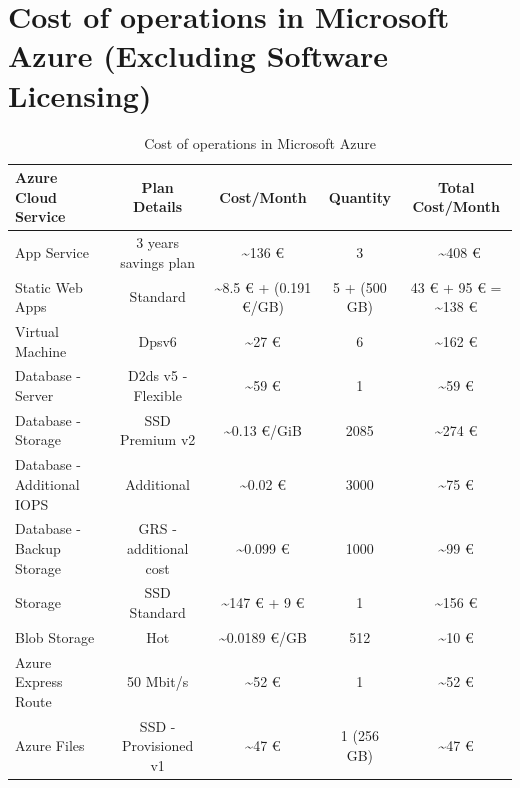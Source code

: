 \documentclass{llncs}
\begin{document}
\section{Cost of operations in Microsoft Azure (Excluding Software Licensing)}
\begin{table}[htbp]
    \centering
    \begin{tabular}{|l|c|c|c|c|}
        \hline
        \textbf{Azure Cloud Service} & \textbf{Plan Details}    & \textbf{Cost/Month}                & \textbf{Quantity} & \textbf{Total Cost/Month}           \\

        \hline
        App Service                  & 3 years savings plan  & \textasciitilde 136 €                & 3                 & ~\textasciitilde 408 €              \\
        \hline
        Static Web Apps              & Standard              & \textasciitilde 8.5 € + (0.191 €/GB) & 5 + (500 GB)      & 43 € + 95 € = \textasciitilde 138 € \\
        \hline
        Virtual Machine              & Dpsv6                 & \textasciitilde 27 €                 & 6                 & \textasciitilde 162 €               \\
        \hline
        Database - Server            & D2ds v5 - Flexible    & \textasciitilde 59 €            & 1              & \textasciitilde 59 €                          \\
        \hline
        Database - Storage           & SSD Premium v2         & \textasciitilde 0.13 €/GiB           & 2085              & \textasciitilde 274 €            \\
        \hline
        Database - Additional IOPS   &  Additional            &   \textasciitilde 0.02 €             & 3000                 & \textasciitilde 75 €         \\
        \hline
        Database - Backup Storage    & GRS - additional cost    & \textasciitilde 0.099 €         & 1000            & \textasciitilde 99 €                             \\
        \hline
        Storage                      & SSD Standard             & \textasciitilde 147 € + 9 €        & 1           & \textasciitilde 156 €                             \\
        \hline
        Blob Storage                 & Hot                      & \textasciitilde 0.0189 €/GB        & 512           & \textasciitilde 10 €                             \\
        \hline
        Azure Express Route          & 50 Mbit/s                 & \textasciitilde 52 €             & 1          & \textasciitilde 52 €                            \\
        \hline
        Azure Files                 & SSD - Provisioned v1       & \textasciitilde 47 €             & 1 (256 GB)         & \textasciitilde 47 €                            \\
        \hline
   
    \end{tabular}
    \caption{Cost of operations in Microsoft Azure}
    \label{tab:Cost_Operation_Monthly}
\end{table}
\end{document}
